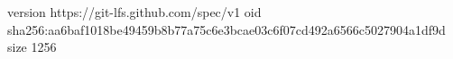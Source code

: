 version https://git-lfs.github.com/spec/v1
oid sha256:aa6baf1018be49459b8b77a75c6e3bcae03c6f07cd492a6566c5027904a1df9d
size 1256
